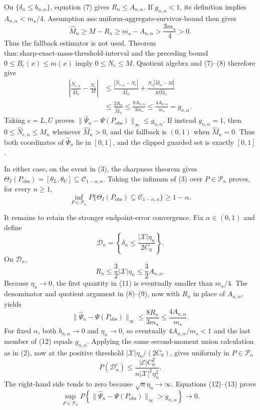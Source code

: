 On \(\{\delta_n\le b_{n,\alpha}\}\), equation (7) gives \(R_n\le A_{n,\alpha}\).  If \(g_{n,\alpha}<1\), its definition implies \(A_{n,\alpha}<m_{\star}/4\).  Assumption \(\mathrm{ass{:}uniform\text{-}aggregate\text{-}survivor\text{-}bound}\) then gives
\[
\widehat M_n\ge M-R_n
\ge m_{\star}-A_{n,\alpha}>\frac{3m_{\star}}4>0.
\tag{8}
\]
Thus the fallback estimator is not used.  Theorem \(\mathrm{thm{:}sharp\text{-}exact\text{-}mass\text{-}threshold\text{-}interval}\) and the preceding bound \(0\le B_e(x)\le m(x)\) imply \(0\le N_e\le M\).  Quotient algebra and (7)--(8) therefore give
\[
\begin{aligned}
\left|\frac{\widehat N_{e,n}}{\widehat M_n}-\frac{N_e}{M}\right|
&\le\frac{|\widehat N_{e,n}-N_e|}{\widehat M_n}
 +\frac{N_e|\widehat M_n-M|}{M\widehat M_n}\\
&\le\frac{2R_n}{\widehat M_n}
\le\frac{8A_{n,\alpha}}{3m_{\star}}
\le\frac{4A_{n,\alpha}}{m_{\star}}
=g_{n,\alpha}.
\end{aligned}
\tag{9}
\]
Taking \(e=L,U\) proves \(\|\widehat\Psi_n-\Psi(P_{\mathrm{obs}})\|_\infty\le g_{n,\alpha}\).  If instead \(g_{n,\alpha}=1\), then \(0\le\widehat N_{e,n}\le\widehat M_n\) whenever \(\widehat M_n>0\), and the fallback is \((0,1)\) when \(\widehat M_n=0\).  Thus both coordinates of \(\widehat\Psi_n\) lie in \([0,1]\), and the clipped guarded set is exactly \([0,1]\).

In either case, on the event in (3), the sharpness theorem gives \(\Theta_I(P_{\mathrm{obs}})=[\theta_L,\theta_U]\subseteq\mathcal C_{1-\alpha,n}\).  Taking the infimum of (3) over \(P\in\mathcal P_n\) proves, for every \(n\ge1\),
\[
\inf_{P\in\mathcal P_n}
P\{\Theta_I(P_{\mathrm{obs}})\subseteq\mathcal C_{1-\alpha,n}\}
\ge1-\alpha.
\tag{10}
\]

It remains to retain the stronger endpoint-error convergence.  Fix \(\alpha\in(0,1)\) and define
\[
\mathcal D_n=\left\{\delta_n\le
\frac{|\mathcal X|\eta_n}{2C_0}\right\}.
\]
On \(\mathcal D_n\),
\[
R_n\le\frac32|\mathcal X|\eta_n
\le\frac32A_{n,\alpha}.
\tag{11}
\]
Because \(\eta_n\to0\), the first quantity in (11) is eventually smaller than \(m_{\star}/4\).  The denominator and quotient argument in (8)--(9), now with \(R_n\) in place of \(A_{n,\alpha}\), yields
\[
\|\widehat\Psi_n-\Psi(P_{\mathrm{obs}})\|_\infty
\le\frac{8R_n}{3m_{\star}}
\le\frac{4A_{n,\alpha}}{m_{\star}}.
\tag{12}
\]
For fixed \(\alpha\), both \(b_{n,\alpha}\to0\) and \(\eta_n\to0\), so eventually \(4A_{n,\alpha}/m_{\star}<1\) and the last member of (12) equals \(g_{n,\alpha}\).  Applying the same second-moment union calculation as in (2), now at the positive threshold \(|\mathcal X|\eta_n/(2C_0)\), gives uniformly in \(P\in\mathcal P_n\)
\[
P(\mathcal D_n^c)
\le \frac{|\mathcal E|C_0^2}
{n|\mathcal X|^2\eta_n^2}.
\tag{13}
\]
The right-hand side tends to zero because \(\sqrt n\eta_n\to\infty\).  Equations (12)--(13) prove
\[
\sup_{P\in\mathcal P_n}
P\!\left\{\|\widehat\Psi_n-\Psi(P_{\mathrm{obs}})\|_\infty>g_{n,\alpha}\right\}
\longrightarrow0.
\tag{14}
\]

